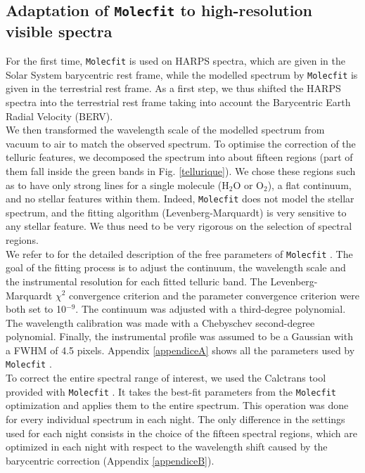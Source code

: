 \documentclass{aa}
\begin{document}
	\subsection{Adaptation of \textnormal{\texttt{Molecfit}}  to high-resolution visible spectra}
	
For the first time, \texttt{Molecfit}  is used on HARPS spectra, which are given in the Solar System barycentric rest frame, while the modelled spectrum by \texttt{Molecfit}  is given in the terrestrial rest frame. As a first step, we thus shifted the HARPS spectra into the terrestrial rest frame taking into account the Barycentric Earth Radial Velocity (BERV).\\
We then transformed the wavelength scale of the modelled spectrum from vacuum to air to match the observed spectrum. To optimise the correction of the telluric features, we decomposed the spectrum into about fifteen regions (part of them fall inside the green bands in Fig. \ref{tellurique}). We chose these regions such as to have only strong lines for a single molecule (H$_{2}$O or O$_{2}$), a flat continuum, and no stellar features within them. Indeed, \texttt{Molecfit}  does not model the stellar spectrum, and the fitting algorithm (Levenberg-Marquardt) is very sensitive to any stellar feature. We thus need to be very rigorous on the selection of spectral regions.\\
We refer to \cite{smette_molecfit_2015} for the detailed description of the free parameters of \texttt{Molecfit} . The goal of the fitting process is to adjust the continuum, the wavelength scale and the instrumental resolution for each fitted telluric band. The Levenberg-Marquardt $\chi^{2}$ convergence criterion and the parameter convergence criterion were both set to 10$^{-9}$.  The continuum was adjusted with a third-degree polynomial. The wavelength calibration was made with a Chebyschev second-degree polynomial. Finally, the instrumental profile  was assumed to be a Gaussian with a FWHM of 4.5 pixels. Appendix \ref{appendiceA} shows all the parameters used by \texttt{Molecfit} .\\
To correct the entire spectral range of interest, we used the Calctrans tool provided with \texttt{Molecfit} . It takes the best-fit parameters from the \texttt{Molecfit}  optimization and applies them to the entire spectrum. This operation was done for every individual spectrum in each night. The only difference in the settings used for each night consists in the choice of the fifteen spectral regions, which are optimized in each night with respect to the wavelength shift caused by the barycentric correction (Appendix \ref{appendiceB}).
\end{document}
